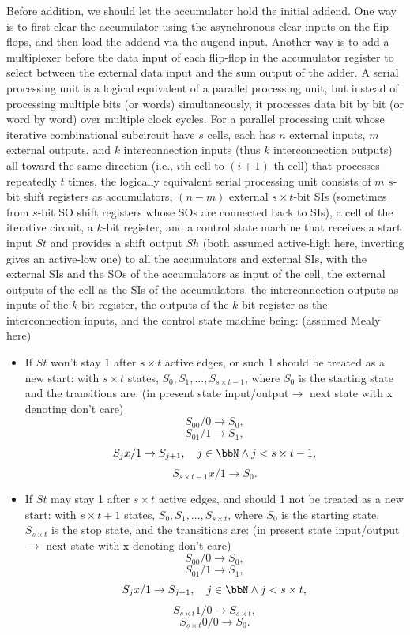 \documentclass[a4paper,12pt]{report}
\begin{document}
Before addition, we should let the accumulator hold the initial addend. One way is to first clear the accumulator using the asynchronous clear inputs on the flip-flops, and then load the addend via the augend input. Another way is to add a multiplexer before the data input of each flip-flop in the accumulator register to select between the external data input and the sum output of the adder.
A serial processing unit is a logical equivalent of a parallel processing unit, but instead of processing multiple bits (or words) simultaneously, it processes data bit by bit (or word by word) over multiple clock cycles. For a parallel processing unit whose iterative combinational subcircuit have $s$ cells, each has $n$ external inputs, $m$ external outputs, and $k$ interconnection inputs (thus $k$ interconnection outputs) all toward the same direction (i.e., $i$th cell to $(i+1)$ th cell) that processes repeatedly $t$ times, the logically equivalent serial processing unit consists of $m$ $s$-bit shift registers as accumulators, $(n-m)$ external $s\times t$-bit SIs (sometimes from $s$-bit SO shift registers whose SOs are connected back to SIs), a cell of the iterative circuit, a $k$-bit register, and a control state machine that receives a start input $St$ and provides a shift output $Sh$ (both assumed active-high here, inverting gives an active-low one) to all the accumulators and external SIs, with the external SIs and the SOs of the accumulators as input of the cell, the external outputs of the cell as the SIs of the accumulators, the interconnection outputs as inputs of the $k$-bit register, the outputs of the $k$-bit register as the interconnection inputs, and the control state machine being: (assumed Mealy here)
\begin{itemize}
\item If $St$ won't stay 1 after $s\times t$ active edges, or such 1 should be treated as a new start: with $s\times t$ states, $S_0,S_1,\ldots,S_{s\times t-1}$, where $S_0$ is the starting state and the transitions are: (in present state input/output$\to$ next state with x denoting don't care)
\[S_00/0\to S_0,\]
\[S_01/1\to S_1,\]
\[S_jx/1\to S_{j+1},\quad j\in\bbN\land j<s\times t-1,\]
\[S_{s\times t-1}x/1\to S_0.\]
\item If $St$ may stay 1 after $s\times t$ active edges, and should 1 not be treated as a new start: with $s\times t+1$ states, $S_0,S_1,\ldots,S_{s\times t}$, where $S_0$ is the starting state, $S_{s\times t}$ is the stop state, and the transitions are: (in present state input/output$\to$ next state with x denoting don't care)
\[S_00/0\to S_0,\]
\[S_01/1\to S_1,\]
\[S_jx/1\to S_{j+1},\quad j\in\bbN\land j<s\times t,\]
\[S_{s\times t}1/0\to S_{s\times t},\]
\[S_{s\times t}0/0\to S_0.\]
\end{itemize}
\end{document}

